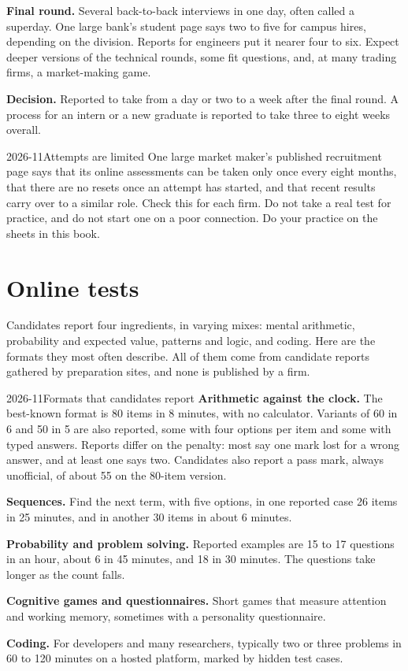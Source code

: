 \textbf{Final round.} Several back-to-back interviews in one day, often called a superday. One large bank's student page says two to five for campus hires, depending on the division. Reports for engineers put it nearer four to six. Expect deeper versions of the technical rounds, some fit questions, and, at many trading firms, a market-making game.

\textbf{Decision.} Reported to take from a day or two to a week after the final round. A process for an intern or a new graduate is reported to take three to eight weeks overall.

\begin{dated}{2026-11}{Attempts are limited}\label{dat:iv1:how-to-train:retakes}
One large market maker's published recruitment page says that its online assessments can be taken only once every eight months, that there are no resets once an attempt has started, and that recent results carry over to a similar role. Check this for each firm. Do not take a real test for practice, and do not start one on a poor connection. Do your practice on the sheets in this book.
\end{dated}

\section{Online tests}\label{sec:iv1:how-to-train:tests}

Candidates report four ingredients, in varying mixes: mental arithmetic, probability and expected value, patterns and logic, and coding. Here are the formats they most often describe. All of them come from candidate reports gathered by preparation sites, and none is published by a firm.

\begin{dated}{2026-11}{Formats that candidates report}\label{dat:iv1:how-to-train:formats}
\textbf{Arithmetic against the clock.} The best-known format is 80 items in 8 minutes, with no calculator. Variants of 60 in 6 and 50 in 5 are also reported, some with four options per item and some with typed answers. Reports differ on the penalty: most say one mark lost for a wrong answer, and at least one says two. Candidates also report a pass mark, always unofficial, of about 55 on the 80-item version.

\textbf{Sequences.} Find the next term, with five options, in one reported case 26 items in 25 minutes, and in another 30 items in about 6 minutes.

\textbf{Probability and problem solving.} Reported examples are 15 to 17 questions in an hour, about 6 in 45 minutes, and 18 in 30 minutes. The questions take longer as the count falls.

\textbf{Cognitive games and questionnaires.} Short games that measure attention and working memory, sometimes with a personality questionnaire.

\textbf{Coding.} For developers and many researchers, typically two or three problems in 60 to 120 minutes on a hosted platform, marked by hidden test cases.
\end{dated}

